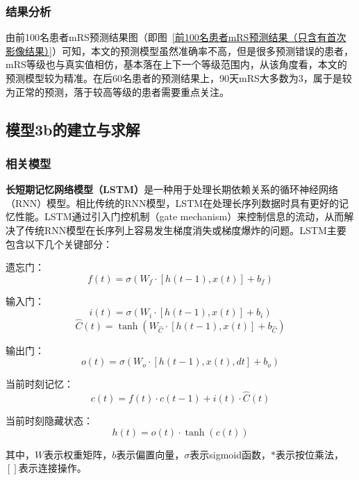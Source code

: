\documentclass[bwprint]{gmcmthesis}
\begin{document}
\subsubsection{结果分析}

由前100名患者mRS预测结果图（即图~\ref{前100名患者mRS预测结果（只含有首次影像结果）}）可知，本文的预测模型虽然准确率不高，但是很多预测错误的患者，mRS等级也与真实值相仿，基本落在上下一个等级范围内，从该角度看，本文的预测模型较为精准。在后60名患者的预测结果上，90天mRS大多数为3，属于是较为正常的预测，落于较高等级的患者需要重点关注。

\subsection{模型3b的建立与求解}
\subsubsection{相关模型}

\textbf{长短期记忆网络模型（LSTM）}\cite{LSTM}是一种用于处理长期依赖关系的循环神经网络（RNN）模型。相比传统的RNN模型，LSTM在处理长序列数据时具有更好的记忆性能。LSTM通过引入门控机制（gate mechanism）来控制信息的流动，从而解决了传统RNN模型在长序列上容易发生梯度消失或梯度爆炸的问题。LSTM主要包含以下几个关键部分：


遗忘门：
\begin{equation}
f(t) = \sigma(W_f \cdot [h(t-1), x(t)] + b_f)
\end{equation}

输入门：
\begin{equation}
i(t) = \sigma(W_i \cdot [h(t-1), x(t)] + b_i)
\end{equation}
\begin{equation}
\hat{C}(t) = \tanh(W_{\hat{C}} \cdot [h(t-1), x(t)] + b_{\hat{C}})
\end{equation}

输出门：
\begin{equation}
o(t) = \sigma(W_o \cdot [h(t-1), x(t), dt] + b_o)
\end{equation}

当前时刻记忆：
\begin{equation}
c(t) = f(t) \cdot c(t-1) + i(t) \cdot \hat{C}(t)
\end{equation}

当前时刻隐藏状态：
\begin{equation}
h(t) = o(t) \cdot \tanh(c(t))
\end{equation}

其中，$W$表示权重矩阵，$b$表示偏置向量，$\sigma$表示sigmoid函数，$*$表示按位乘法，$[]$表示连接操作。
\end{document}
